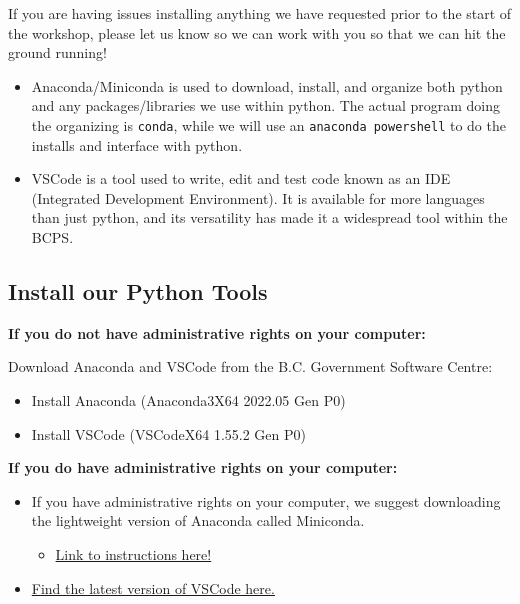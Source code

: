 \documentclass[
  letterpaper,
  DIV=11,
  numbers=noendperiod]{scrreprt}
\providecommand{\tightlist}{%
  \setlength{\itemsep}{0pt}\setlength{\parskip}{0pt}}\usepackage{longtable,booktabs,array}
\begin{document}
\begin{tcolorbox}[enhanced jigsaw, colframe=quarto-callout-important-color-frame, toprule=.15mm, colback=white, leftrule=.75mm, rightrule=.15mm, breakable, colbacktitle=quarto-callout-important-color!10!white, arc=.35mm, bottomtitle=1mm, bottomrule=.15mm, titlerule=0mm, title=\textcolor{quarto-callout-important-color}{\faExclamation}\hspace{0.5em}{Important}, toptitle=1mm, left=2mm, opacityback=0, coltitle=black, opacitybacktitle=0.6]
If you are having issues installing anything we have requested prior to
the start of the workshop, please let us know so we can work with you so
that we can hit the ground running!
\end{tcolorbox}

\begin{itemize}
\tightlist
\item
  Anaconda/Miniconda is used to download, install, and organize both
  python and any packages/libraries we use within python. The actual
  program doing the organizing is \texttt{conda}, while we will use an
  \texttt{anaconda\ powershell} to do the installs and interface with
  python.
\item
  VSCode is a tool used to write, edit and test code known as an IDE
  (Integrated Development Environment). It is available for more
  languages than just python, and its versatility has made it a
  widespread tool within the BCPS.
\end{itemize}

\hypertarget{install-our-python-tools}{%
\subsection{Install our Python Tools}\label{install-our-python-tools}}

\textbf{If you do not have administrative rights on your computer:}

Download Anaconda and VSCode from the B.C. Government Software Centre:

\begin{itemize}
\tightlist
\item
  Install Anaconda (Anaconda3X64 2022.05 Gen P0)
\item
  Install VSCode (VSCodeX64 1.55.2 Gen P0)
\end{itemize}

\textbf{If you do have administrative rights on your computer:}

\begin{itemize}
\tightlist
\item
  If you have administrative rights on your computer, we suggest
  downloading the lightweight version of Anaconda called Miniconda.

  \begin{itemize}
  \tightlist
  \item
    \href{https://docs.conda.io/projects/continuumio-conda/en/latest/user-guide/install/windows.html}{Link
    to instructions here!}
  \end{itemize}
\item
  \href{https://code.visualstudio.com/download}{Find the latest version
  of VSCode here.}
\end{itemize}
\end{document}
